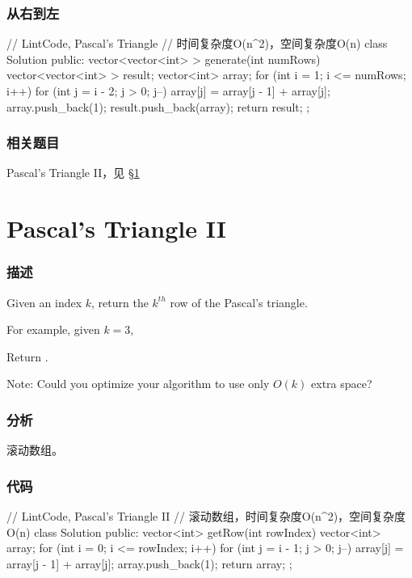 \subsubsection{从右到左}
\begin{Code}
// LintCode, Pascal's Triangle
// 时间复杂度O(n^2)，空间复杂度O(n)
class Solution {
public:
    vector<vector<int> > generate(int numRows) {
        vector<vector<int> > result;
        vector<int> array;
        for (int i = 1; i <= numRows; i++) {
            for (int j = i - 2; j > 0; j--) {
                array[j] = array[j - 1] + array[j];
            }
            array.push_back(1);
            result.push_back(array);
        }
        return result;
    }
};
\end{Code}


\subsubsection{相关题目}
\begindot
\item Pascal's Triangle II，见 \S \ref{sec:pascals-triangle-ii}
\myenddot


\section{Pascal's Triangle II} %
\label{sec:pascals-triangle-ii}


\subsubsection{描述}
Given an index $k$, return the $k^{th}$ row of the Pascal's triangle.

For example, given $k = 3$,

Return \code{[1,3,3,1]}.

Note: Could you optimize your algorithm to use only $O(k)$ extra space?


\subsubsection{分析}
滚动数组。


\subsubsection{代码}

\begin{Code}
// LintCode, Pascal's Triangle II
// 滚动数组，时间复杂度O(n^2)，空间复杂度O(n)
class Solution {
public:
	vector<int> getRow(int rowIndex) {
		vector<int> array;
		for (int i = 0; i <= rowIndex; i++) {
			for (int j = i - 1; j > 0; j--){
				array[j] = array[j - 1] + array[j];
			}
			array.push_back(1);
		}
		return array;
	}
};
\end{Code}


